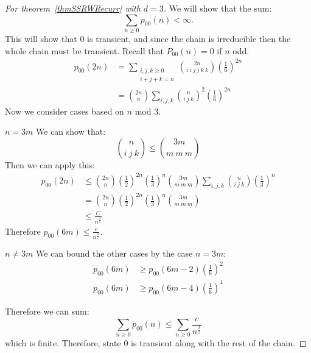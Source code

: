 \documentclass[../Main.tex]{subfiles}
\begin{document}
\begin{proof}[For theorem~\ref{thmSSRWRecurr} with $d = 3$]
    We will show that the sum:
    \begin{equation*}
        \sum_{n \geq 0} p_{00}(n) < \infty.
    \end{equation*}
    This will show that $0$ is transient, and since the chain is irreducible then the whole chain must be transient. Recall that $P_{00}(n) = 0$ if $n$ odd.
    \begin{align*}
        p_{00}(2n) &= \sum_{\substack{i, j, k \geq 0\\i + j + k = n}} \binom{2n}{i~i~j~j~k~k} \left(\frac{1}{6}\right)^{2n} \\
        &= \binom{2n}{n} \sum_{i, j, k} \binom{n}{i~j~k}^2 \left(\frac16\right)^{2n}
    \end{align*}
    Now we consider cases based on $n$ mod $3$.
    \begin{case}{$n = 3m$}
        We can show that:
        \begin{equation*}
            \binom{n}{i~j~k} \leq \binom{3m}{m~m~m}
        \end{equation*}
        Then we can apply this:
        \begin{align*}
            p_{00}(2n) &\leq \binom{2n}{n} \left(\frac12\right)^{2n} \left(\frac13\right)^n \binom{3m}{m~m~m} \sum_{i, j, k} \binom{n}{i~j~k} \left(\frac13\right)^n \\
            &= \binom{2n}{n} \left(\frac12\right)^{2n} \left(\frac13\right)^n \binom{3m}{m~m~m} \\
            &\leq \frac{C}{n^{\frac32}}
        \end{align*}
        Therefore $p_{00}(6m) \leq \frac{c}{n^\frac32}$.
    \end{case}
    \begin{case}{$n \neq 3m$}
        We can bound the other cases by the case $n = 3m$:
        \begin{align*}
            p_{00}(6m) &\geq p_{00}(6m-2) \left(\frac{1}{6}\right)^2 \\
            p_{00}(6m) &\geq p_{00}(6m-4) \left(\frac{1}{6}\right)^4
        \end{align*}
    \end{case}
    Therefore we can sum:
    \begin{equation*}
        \sum_{n \geq 0} p_{00}(n) \leq \sum_{n \geq 0} \frac{c}{n^\frac32}
    \end{equation*}
    which is finite. Therefore, state $0$ is transient along with the rest of the chain.
\end{proof}
\end{document}
